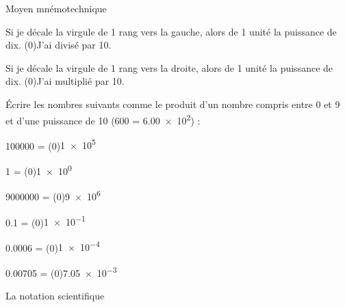 \pasCorrection{\vspace*{-18pt}}
\begin{doc}{Moyen mnémotechnique}
  \vspace*{-8pt}
  \begin{listePoints}
    \setlength\itemsep{-8pt}
    \item Si je décale la virgule de 1 rang vers la gauche, alors
     de 1 unité la puissance de dix. \texteTrou(0){J'ai divisé par 10.}
    \item Si je décale la virgule de 1 rang vers la droite, alors
     de 1 unité la puissance de dix. \texteTrou(0){J'ai multiplié par 10.}
  \end{listePoints}
\end{doc}


\vspace*{-12pt}

\numeroQuestion Écrire les nombres suivants comme le produit d'un nombre compris entre 0 et 9 et d'une puissance de 10 (\exemple \num{600} = \num{6,00e2}) :
\pasCorrection{\vspace*{-4pt}}
\begin{listePoints}[2]
  \setlength\itemsep{-4pt}
  \item \num{100000}  = \texteTrou(0){\num{1e5}}
  \item \num{1}       = \texteTrou(0){\num{1e0}}
  \item \num{9000000} = \texteTrou(0){\num{9e6}}
  \item \num{0,1}     = \texteTrou(0){\num{1e-1}}
  \item \num{0,0006}  = \texteTrou(0){\num{1e-4}}
  \item \num{0,00705} = \texteTrou(0){\num{7,05e-3}}
\end{listePoints}

\begin{doc}{La notation scientifique}
  
\end{doc}

